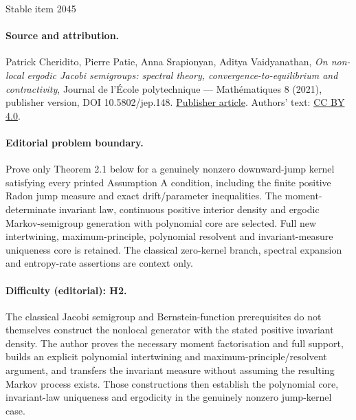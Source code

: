 \documentclass[11pt]{article}
\numberwithin{equation}{section}
\begin{document}
\begin{center}{\Large Stable item 2045}\end{center}
\paragraph{Source and attribution.}
Patrick Cheridito, Pierre Patie, Anna Srapionyan, Aditya Vaidyanathan, \emph{On non-local ergodic Jacobi semigroups: spectral theory, convergence-to-equilibrium and contractivity}, Journal de l’École polytechnique — Mathématiques 8 (2021), publisher version, DOI 10.5802/jep.148. \href{https://jep.centre-mersenne.org/articles/10.5802/jep.148/}{Publisher article}. Authors' text: \href{https://creativecommons.org/licenses/by/4.0/}{CC BY 4.0}.
\paragraph{Editorial problem boundary.}
Prove only Theorem 2.1 below for a genuinely nonzero downward-jump kernel satisfying every printed Assumption A condition, including the finite positive Radon jump measure and exact drift/parameter inequalities. The moment-determinate invariant law, continuous positive interior density and ergodic Markov-semigroup generation with polynomial core are selected. Full new intertwining, maximum-principle, polynomial resolvent and invariant-measure uniqueness core is retained. The classical zero-kernel branch, spectral expansion and entropy-rate assertions are context only.
\paragraph{Difficulty (editorial): H2.}
The classical Jacobi semigroup and Bernstein-function prerequisites do not themselves construct the nonlocal generator with the stated positive invariant density. The author proves the necessary moment factorisation and full support, builds an explicit polynomial intertwining and maximum-principle/resolvent argument, and transfers the invariant measure without assuming the resulting Markov process exists. Those constructions then establish the polynomial core, invariant-law uniqueness and ergodicity in the genuinely nonzero jump-kernel case.
\end{document}
